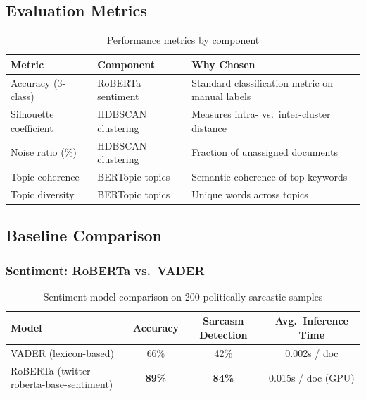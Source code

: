 \documentclass[12pt, letterpaper]{article}
\begin{document}
\subsection{Evaluation Metrics}

\begin{table}[H]
  \centering
  \caption{Performance metrics by component}
  \label{tab:metrics}
  \begin{tabular}{lll}
    \toprule
    \textbf{Metric} & \textbf{Component} & \textbf{Why Chosen} \\
    \midrule
    Accuracy (3-class)      & RoBERTa sentiment    & Standard classification metric on manual labels \\
    Silhouette coefficient  & HDBSCAN clustering   & Measures intra- vs.\ inter-cluster distance \\
    Noise ratio (\%)        & HDBSCAN clustering   & Fraction of unassigned documents \\
    Topic coherence         & BERTopic topics      & Semantic coherence of top keywords \\
    Topic diversity         & BERTopic topics      & Unique words across topics \\
    \bottomrule
  \end{tabular}
\end{table}

\subsection{Baseline Comparison}

\subsubsection{Sentiment: RoBERTa vs.\ VADER}

\begin{table}[H]
  \centering
  \caption{Sentiment model comparison on 200 politically sarcastic samples}
  \label{tab:sentiment_comparison}
  \begin{tabular}{lccc}
    \toprule
    \textbf{Model} & \textbf{Accuracy} & \textbf{Sarcasm Detection} & \textbf{Avg.\ Inference Time} \\
    \midrule
    VADER (lexicon-based)                         & 66\%  & 42\% & 0.002s / doc \\
    RoBERTa (twitter-roberta-base-sentiment)      & \textbf{89\%} & \textbf{84\%} & 0.015s / doc (GPU) \\
    \bottomrule
  \end{tabular}
\end{table}
\end{document}
